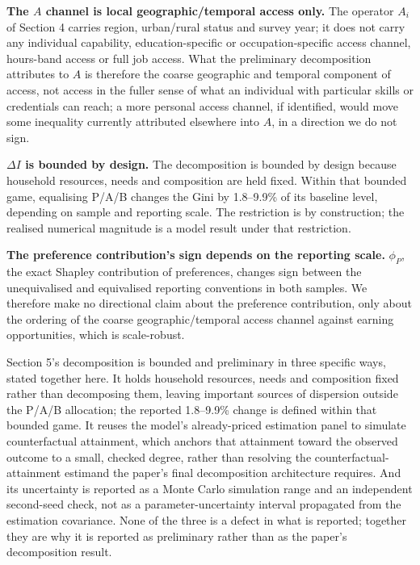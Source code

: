 \documentclass[11pt,a4paper]{article}
\begin{document}
\textbf{The \(A\) channel is local geographic/temporal access only.} The operator \(A_i\) of Section 4 carries region, urban/rural status and survey year; it does not carry any individual capability, education-specific or occupation-specific access channel, hours-band access or full job access. What the preliminary decomposition attributes to \(A\) is therefore the coarse geographic and temporal component of access, not access in the fuller sense of what an individual with particular skills or credentials can reach; a more personal access channel, if identified, would move some inequality currently attributed elsewhere into \(A\), in a direction we do not sign.

\textbf{\(\Delta I\) is bounded by design.} The decomposition is bounded by design because household resources, needs and composition are held fixed. Within that bounded game, equalising P/A/B changes the Gini by 1.8--9.9\% of its baseline level, depending on sample and reporting scale. The restriction is by construction; the realised numerical magnitude is a model result under that restriction.

\textbf{The preference contribution's sign depends on the reporting scale.} \(\phi_P\), the exact Shapley contribution of preferences, changes sign between the unequivalised and equivalised reporting conventions in both samples. We therefore make no directional claim about the preference contribution, only about the ordering of the coarse geographic/temporal access channel against earning opportunities, which is scale-robust.

Section 5's decomposition is bounded and preliminary in three specific ways, stated together here. It holds household resources, needs and composition fixed rather than decomposing them, leaving important sources of dispersion outside the P/A/B allocation; the reported 1.8--9.9\% change is defined within that bounded game. It reuses the model's already-priced estimation panel to simulate counterfactual attainment, which anchors that attainment toward the observed outcome to a small, checked degree, rather than resolving the counterfactual-attainment estimand the paper's final decomposition architecture requires. And its uncertainty is reported as a Monte Carlo simulation range and an independent second-seed check, not as a parameter-uncertainty interval propagated from the estimation covariance. None of the three is a defect in what is reported; together they are why it is reported as preliminary rather than as the paper's decomposition result.
\end{document}
